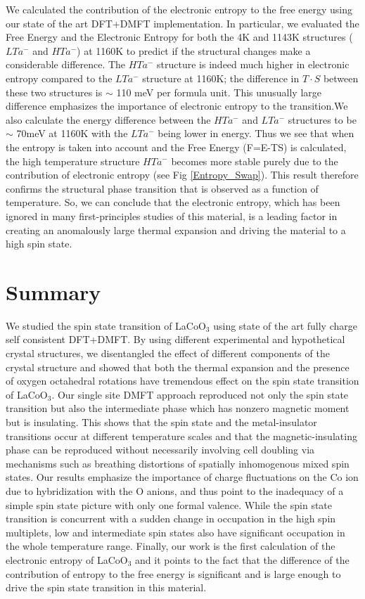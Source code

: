 \documentclass[10pt]{ruthesis}
\begin{document}
{We calculated the contribution of the electronic entropy to the free energy using our state of the art DFT+DMFT implementation\cite{Birol}. 
In particular, we evaluated the Free Energy and the Electronic Entropy for both the 4K and 1143K structures ($LTa^-$ and $HTa^-$) at 1160K to predict if the structural changes make a considerable difference. 
%
The $HTa^-$ structure is indeed much higher in electronic entropy compared to the $LTa^-$ structure at 1160K; the difference in $T\cdot S$ between these two structures is $\sim$ 110 meV per formula unit. This unusually large difference emphasizes the importance of electronic entropy to the transition.We also calculate the energy difference between the $HTa^-$ and $LTa^-$ structures to be $\sim$ 70meV at 1160K with the $LTa^-$ being lower in energy. Thus we see that when the entropy is taken into account and the Free Energy (F=E-TS) is calculated, the high temperature structure $HTa^-$ becomes more stable purely due to the contribution of electronic entropy (see Fig \ref{Entropy_Swap}).  This result therefore confirms the structural phase transition that is observed as a function of temperature. So, we can conclude that the electronic entropy, which has been ignored in many first-principles studies of this material, is a leading factor in creating an anomalously large thermal expansion and driving the material to a high spin state. 




\section{Summary} 
We studied the spin state transition of LaCoO$_3$ using state of the art fully charge self consistent DFT+DMFT. By using different experimental and hypothetical crystal structures, we disentangled the effect of different components of the crystal structure and showed that both the thermal expansion and the presence of oxygen octahedral rotations have tremendous effect on the spin state transition of LaCoO$_3$. Our single site DMFT approach reproduced not only the spin state transition but also the intermediate phase which has nonzero magnetic moment but is insulating. This shows that the spin state and the metal-insulator transitions occur at different temperature scales and that the magnetic-insulating phase can be reproduced without  necessarily involving cell doubling via mechanisms such as breathing distortions of spatially inhomogenous mixed spin states. Our results emphasize the importance of charge fluctuations on the Co ion due to hybridization with the O anions, and thus point to the inadequacy of a simple spin state picture with only one formal valence. While the spin state transition is concurrent with a sudden change in occupation in the high spin multiplets, low and intermediate spin states also have significant occupation in the whole temperature range. Finally, our work is the first calculation of the electronic entropy of LaCoO$_3$ and it points to the fact that the difference of the contribution of entropy to the free energy is significant and is large enough to drive the spin state transition in this material. 

}
\end{document}
